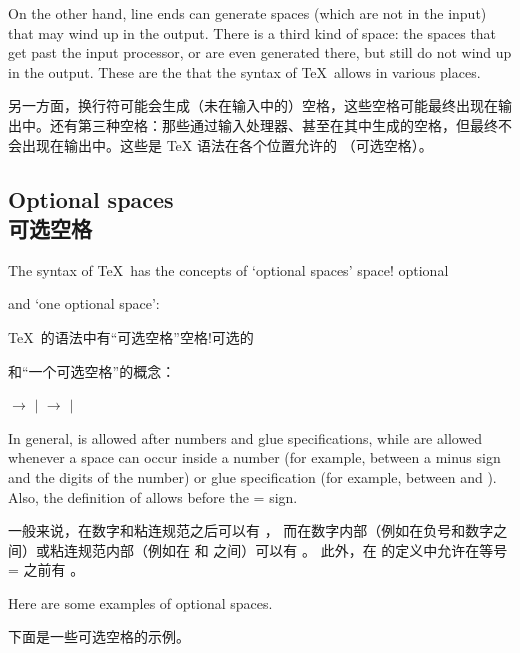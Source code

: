 On the other hand, line ends can generate spaces (which are not
in the input) that may wind up in the output.
There is a third kind of space: the spaces that get past the
input processor,
or are even generated there, but still do not wind up in the
output. These are the  that the 
syntax of \TeX\ allows in various places.

另一方面，换行符可能会生成（未在输入中的）空格，这些空格可能最终出现在输出中。还有第三种空格：那些通过输入处理器、甚至在其中生成的空格，但最终不会出现在输出中。这些是 \TeX{} 语法在各个位置允许的 （可选空格）。


\subsection{Optional spaces\\可选空格}

The syntax of \TeX\ has the concepts of `optional spaces'
\term space! optional \par
and `one optional space':

\TeX\ 的语法中有“可选空格”\term 空格!可选的 \par 和“一个可选空格”的概念：
\begin{disp} $\longrightarrow$
 $|$ \nl
{} $\longrightarrow$
 $|$ \end{disp}
In general,  is allowed after
numbers and glue specifications, while  are
allowed whenever a space can occur inside a number
(for example, between a minus sign and the digits of the number)
or glue specification (for example, between  and ).
Also, the definition of  allows 
before the \n= sign.

一般来说，在数字和粘连规范之后可以有 ，
而在数字内部（例如在负号和数字之间）或粘连规范内部（例如在  和  之间）可以有 。
此外，在 的定义中允许在等号 \n= 之前有 。

Here are some examples of optional spaces.

下面是一些可选空格的示例。



